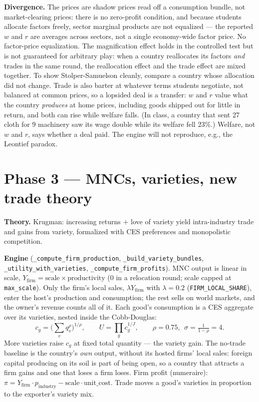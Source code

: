\documentclass[11pt]{article}
\newcommand{\code}[1]{\texttt{#1}}
\begin{document}
\textbf{Divergence.} The prices are shadow prices read off a consumption bundle,
not market-clearing prices: there is no zero-profit condition, and because
students allocate factors freely, sector marginal products are not equalized ---
the reported $w$ and $r$ are averages across sectors, not a single economy-wide
factor price. No factor-price equalization. The magnification effect holds in
the controlled test but is not guaranteed for arbitrary play: when a country
reallocates its factors \emph{and} trades in the same round, the reallocation
effect and the trade effect are mixed together. To show Stolper-Samuelson
cleanly, compare a country whose allocation did not change. Trade is also barter
at whatever terms students negotiate, not balanced at common prices, so a
lopsided deal is a transfer: $w$ and $r$ value what the country
\emph{produces} at home prices, including goods shipped out for little in
return, and both can rise while welfare falls. (In class, a country that sent
27 cloth for 9 machinery saw its wage double while its welfare fell 23\%.)
Welfare, not $w$ and $r$, says whether a deal paid. The engine will not
reproduce, e.g., the Leontief paradox.

\section{Phase 3 --- MNCs, varieties, new trade theory}
\textbf{Theory.} Krugman: increasing returns $+$ love of variety yield
intra-industry trade and gains from variety, formalized with CES preferences and
monopolistic competition.

\textbf{Engine} (\code{\_compute\_firm\_production}, \code{\_build\_variety\_bundles},
\code{\_utility\_with\_varieties}, \code{\_compute\_firm\_profits}).
MNC output is linear in scale, $Y_{\text{firm}} = \text{scale}\times\text{productivity}$
(0 in a relocation round; scale capped at \code{max\_scale}). Only the firm's
local sales, $\lambda Y_{\text{firm}}$ with $\lambda = 0.2$ (\code{FIRM\_LOCAL\_SHARE}),
enter the host's production and consumption; the rest sells on world markets,
and the owner's revenue counts all of it. Each good's
consumption is a CES aggregate over its varieties, nested inside the Cobb-Douglas:
\[
c_g = \Big(\textstyle\sum_{v} q_v^{\rho}\Big)^{1/\rho}, \qquad
U = \prod_{g} c_g^{1/J}, \qquad \rho = 0.75,\ \ \sigma = \tfrac{1}{1-\rho} = 4 .
\]
More varieties raise $c_g$ at fixed total quantity --- the variety gain. The
no-trade baseline is the country's \emph{own} output, without its hosted firms'
local sales: foreign capital producing on its soil is part of being open, so a
country that attracts a firm gains and one that loses a firm loses. Firm
profit (numeraire): $\pi = Y_{\text{firm}}\cdot p_{\text{industry}} -
\text{scale}\cdot\text{unit\_cost}$. Trade moves a good's varieties in proportion
to the exporter's variety mix.
\end{document}
